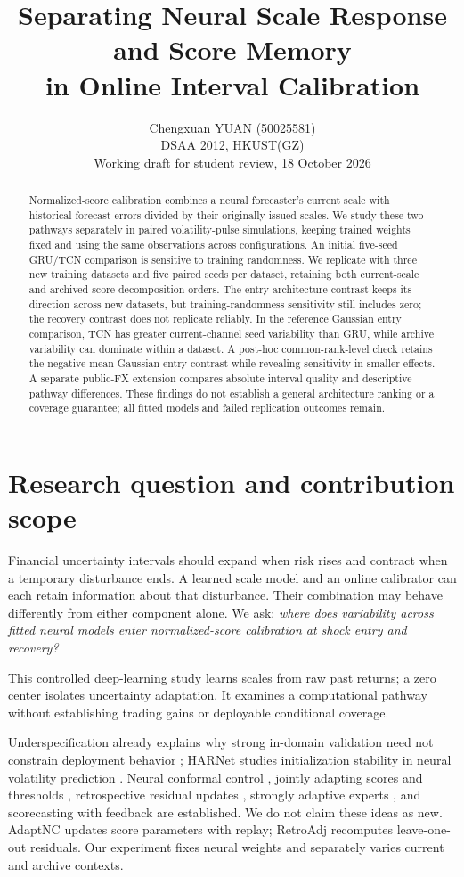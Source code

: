 \documentclass{article}
\title{Separating Neural Scale Response and Score Memory\\in Online Interval Calibration}
\author{Chengxuan YUAN (50025581)\\DSAA 2012, HKUST(GZ)\\Working draft for student review, 18 October 2026}
\begin{document}
\maketitle
\begin{abstract}
Normalized-score calibration combines a neural forecaster's current scale with
historical forecast errors divided by their originally issued scales. We study
these two pathways separately in paired volatility-pulse simulations, keeping
trained weights fixed and using the same observations across configurations.
An initial five-seed GRU/TCN comparison is sensitive to training randomness.
We replicate with three new training datasets and five paired seeds per dataset,
retaining both current-scale and archived-score decomposition orders.
The entry architecture contrast keeps its direction across new datasets, but
training-randomness sensitivity still includes zero; the recovery contrast
does not replicate reliably. In the reference Gaussian entry comparison,
TCN has greater current-channel seed variability than GRU, while archive
variability can dominate within a dataset.
A post-hoc common-rank-level check retains the negative mean Gaussian entry contrast while
revealing sensitivity in smaller effects. A separate public-FX extension
compares absolute interval quality and descriptive pathway differences.
These findings do not establish a general architecture ranking or a
coverage guarantee; all fitted models and failed replication outcomes remain.
\end{abstract}

\section{Research question and contribution scope}
Financial uncertainty intervals should expand when risk rises and contract
when a temporary disturbance ends. A learned scale model and an online
calibrator can each retain information about that disturbance. Their
combination may behave differently from either component alone.
We ask: \emph{where does variability across fitted neural models enter
normalized-score calibration at shock entry and recovery?}

This controlled deep-learning study learns scales from raw past returns;
a zero center isolates uncertainty adaptation. It examines a computational
pathway without establishing trading gains or deployable conditional coverage.

Underspecification already explains why strong in-domain validation need not
constrain deployment behavior \citep{damour}; HARNet studies initialization
stability in neural volatility prediction \citep{harnet}. Neural conformal
control \citep{ncc}, jointly adapting scores and thresholds \citep{adapt},
retrospective residual updates \citep{retro}, strongly adaptive experts
\citep{saocp}, and scorecasting with feedback \citep{pid} are established.
We do not claim these ideas as new.
AdaptNC updates score parameters with replay; RetroAdj recomputes
leave-one-out residuals. Our experiment fixes neural weights and separately
varies current and archive contexts.
\end{document}
